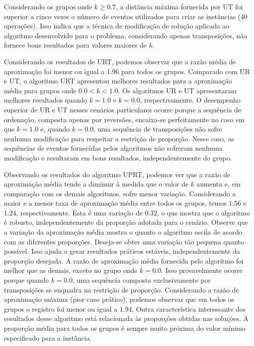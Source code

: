 Considerando os grupos onde $k \ge 0.7$, a distância máxima fornecida por UT foi superior a cinco vezes o número de eventos utilizados para criar as instâncias (40 operações). Isso indica que a técnica de modificação de solução aplicada ao algoritmo desenvolvido para o problema, considerando apenas transposições, não fornece bons resultados para valores maiores de $k$.

Considerando os resultados de URT, podemos observar que a razão média de aproximação foi menor ou igual a 1.96 para todos os grupos. Comparado com UR e UT, o algoritmo URT apresentou melhores resultados para a aproximação média para grupos onde $0.0 < k < 1.0$. Os algoritmos UR e UT apresentaram melhores resultados quando $k = 1.0$ e $k = 0.0$, respectivamente. O desempenho superior de UR e UT nesses cenários particulares ocorre porque a sequência de ordenação, composta apenas por reversões, encaixa-se perfeitamente no caso em que $k = 1.0$ e, quando $k = 0.0$, uma sequência de transposições não sofre nenhuma modificação para respeitar a restrição de proporção. Nesse caso, as sequências de eventos fornecidas pelos algoritmos não sofreram nenhuma modificação e resultaram em bons resultados, independentemente do grupo.

Observando os resultados do algoritmo UPRT, podemos ver que a razão de aproximação média tende a diminuir à medida que o valor de $k$ aumenta e, em comparação com os demais algoritmos, sofre menor variação. Considerando a maior e a menor taxa de aproximação média entre todos os grupos, temos $1.56$ e $1.24$, respectivamente. Esta é uma variação de $0.32$, o que mostra que o algoritmo é robusto, independentemente da proporção adotada para o cenário. Observe que a variação da aproximação média mostra o quanto o algoritmo oscila de acordo com as diferentes proporções. Deseja-se obter uma variação tão pequena quanto possível. Isso ajuda a gerar resultados práticos estáveis, independentemente da proporção desejada. A razão de aproximação média fornecida pelo algoritmo foi melhor que as demais, exceto no grupo onde $k = 0.0$. Isso provavelmente ocorre porque quando $k = 0.0$, uma sequência composta exclusivamente por transposições se enquadra na restrição de proporção. Considerando a razão de aproximação máxima (pior caso prático), podemos observar que em todos os grupos o registro foi menor ou igual a $1.94$. Outra característica interessante dos resultados desse algoritmo está relacionada às proporções obtidas nas soluções. A proporção média para todos os grupos é sempre muito próxima do valor mínimo especificado para a instância.

